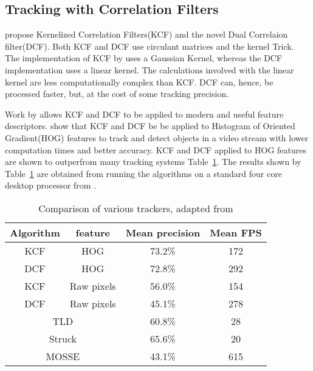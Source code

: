 \subsection{Tracking with Correlation Filters}
\citeauthor{Enriques2014} \cite{Enriques2014} propose Kernelized Correlation Filters(KCF) and the novel Dual Correlaion filter(DCF).
Both KCF and DCF use circulant matrices and the kernel Trick.
The implementation of KCF by \citeauthor{Enriques2014} uses a Gaussian Kernel, whereas the DCF implementation uses a linear kernel.
The calculations involved with the linear kernel are less computationally complex than KCF. 
DCF can, hence, be processed faster, but, at the cost of some tracking precision.

Work by \citeauthor{multichannelCorrFilters} \cite{multichannelCorrFilters} allows KCF and DCF to be applied to modern and useful feature descriptors.
\citeauthor{Enriques2014} show that KCF and DCF be be applied to Histogram of Oriented Gradient(HOG) features to track and detect objects in a video stream with lower computation times and better accuracy.
KCF and DCF applied to HOG features are shown to outperfrom many tracking systems Table~\ref{tab:trackers}.
The results shown by Table~\ref{tab:trackers} are obtained from running the algorithms on a standard four core desktop processor from .

\begin{table}
  \centering
  \begin{tabular}[t]{cccc}
    \toprule
    Algorithm & feature & Mean precision & Mean FPS \\
    \midrule
    KCF       & HOG     & 73.2\%         & 172      \\
    \hline
    DCF       & HOG     & 72.8\%         & 292      \\
    \hline
    KCF       & Raw pixels & 56.0\%      & 154      \\
    \hline
    DCF       & Raw pixels & 45.1\%      & 278      \\
    \midrule
    \midrule
    \multicolumn{2}{c}{TLD}   & 60.8\%      &  28      \\
    \hline
    \multicolumn{2}{c}{Struck\cite{struck}}& 65.6\%     &  20     \\
    \hline
    \multicolumn{2}{c}{MOSSE\cite{mosse}}& 43.1\%      &  615     \\
    \bottomrule
  \end{tabular}
  \caption{Comparison of various trackers, adapted from \cite{Enriques2014}}
  \label{tab:trackers}
\end{table}

